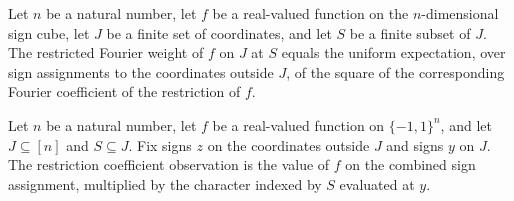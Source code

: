 \begin{theorem}
\label{FABL.restrictedFourierWeight_eq_expect_sq_restrictionFourierCoeff}
\leanok
{}
Let $n$ be a natural number, let $f$ be a real-valued function on the $n$-dimensional
sign cube, let $J$ be a finite set of coordinates, and let $S$ be a finite subset of
$J$. The restricted Fourier weight of $f$ on $J$ at $S$ equals the uniform expectation,
over sign assignments to the coordinates outside $J$, of the square of the corresponding
Fourier coefficient of the restriction of $f$.
\end{theorem}

\begin{definition}
\label{FABL.restrictionCoefficientObservation}
\leanok
{}
Let $n$ be a natural number, let $f$ be a real-valued function on $\{−1,1\}^n$, and
let $J\subseteq[n]$ and $S\subseteq J$. Fix signs $z$ on the coordinates outside $J$
and signs $y$ on $J$. The restriction coefficient observation is the value of $f$ on the
combined sign assignment, multiplied by the character indexed by $S$ evaluated at $y$.
\end{definition}

